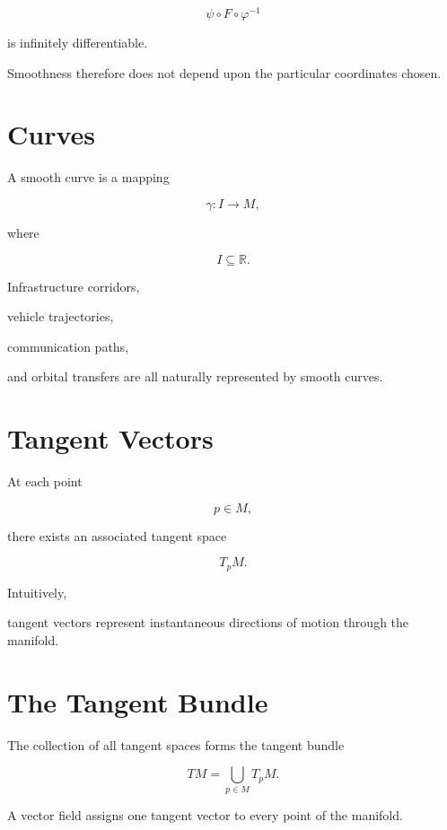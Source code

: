 \documentclass[11pt,fleqn]{book}
\numberwithin{equation}{chapter}
\theoremstyle{plain}
\theoremstyle{definition}
\theoremstyle{remark}
\begin{document}
\[
\psi
\circ
F
\circ
\varphi^{-1}
\]

is infinitely differentiable.

Smoothness therefore does not depend upon the particular coordinates
chosen.


\section{Curves}

A smooth curve is a mapping

\[
\gamma:I\rightarrow M,
\]

where

\[
I
\subseteq
\mathbb R.
\]

Infrastructure corridors,

vehicle trajectories,

communication paths,

and orbital transfers are all naturally represented by smooth curves.


\section{Tangent Vectors}

At each point

\[
p\in M,
\]

there exists an associated tangent space

\[
T_pM.
\]

Intuitively,

tangent vectors represent instantaneous directions of motion through
the manifold.


\section{The Tangent Bundle}

The collection of all tangent spaces forms the tangent bundle

\[
\boxed{
TM
=
\bigcup_{p\in M}
T_pM.
}
\]

A vector field assigns one tangent vector to every point of the
manifold.

\end{document}
